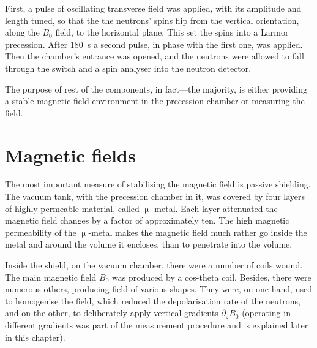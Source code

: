 First, a pulse of oscillating transverse field was applied, with its amplitude and length tuned, so that the the neutrons' spins flip from the vertical orientation, along the $B_0$ field, to the horizontal plane. This set the spins into a Larmor precession.
After \SI{180}{\second} a second pulse, in phase with the first one, was applied. Then the chamber's entrance was opened, and the neutrons were allowed to fall through the switch and a spin analyser into the neutron detector.


The purpose of rest of the components, in fact---the majority, is either providing a stable magnetic field environment in the precession chamber or measuring the field.




\section{Magnetic fields}
The most important measure of stabilising the magnetic field is passive shielding. The vacuum tank, with the precession chamber in it, was covered by four layers of highly permeable material, called $\upmu$-metal.
Each layer attenuated the magnetic field changes by a factor of approximately ten. The high magnetic permeability of the $\upmu$-metal makes the magnetic field much rather go inside the metal and around the volume it encloses, than to penetrate into the volume. 

Inside the shield, on the vacuum chamber, there were a number of coils wound. The main magnetic field $B_0$ was produced by a cos-theta coil.
Besides, there were numerous others, producing field of various shapes.
They were, on one hand, used to homogenise the field, which reduced the depolarisation rate of the neutrons,
and on the other, to deliberately apply vertical gradients $\partial_z B_0$ (operating in different gradients was part of the measurement procedure and is explained later in this chapter).

